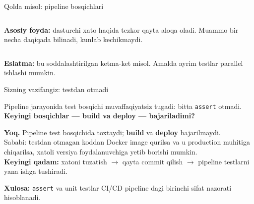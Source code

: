 \documentclass[aspectratio=169,11pt]{beamer}
\newcommand{\uzq}{\textquotesingle{}}   %
\begin{document}
\begin{frame}{Qo\uzq{}lda misol: pipeline bosqichlari}
\begin{columns}[T,totalwidth=\textwidth]
    \begin{column}{0.41\textwidth}
      \begin{tcolorbox}[okbox,top=2pt,bottom=2pt,left=4pt,right=4pt]
        \footnotesize
        \textbf{Asosiy foyda:}
        dasturchi xato haqida tezkor qayta aloqa oladi.
        Muammo bir necha daqiqada bilinadi, kunlab kechikmaydi.
      \end{tcolorbox}
    \end{column}
  \end{columns}

  \vspace{2pt}
  {\scriptsize
  \textbf{Eslatma:} bu soddalashtirilgan ketma-ket misol.
  Amalda ayrim testlar parallel ishlashi mumkin.
  }
\end{frame}

\begin{frame}{Sizning vazifangiz: testdan o\uzq{}tmadi}
  \small

  \begin{tcolorbox}[warnbox,title=Savol,top=2pt,bottom=2pt]
    Pipeline jarayonida test bosqichi muvaffaqiyatsiz tugadi:
    bitta \texttt{assert} o\uzq{}tmadi.\\[3pt]
    \textbf{Keyingi bosqichlar --- build va deploy --- bajariladimi?}
  \end{tcolorbox}

  \pause

  \vspace{3pt}

  \begin{tcolorbox}[okbox,title=Javob,top=2pt,bottom=2pt]
    \small
    \textbf{Yo\uzq{}q.} Pipeline test bosqichida to\uzq{}xtaydi;
    \textbf{build} va \textbf{deploy} bajarilmaydi.\\[4pt]

    \footnotesize
    Sababi: testdan o\uzq{}tmagan koddan Docker image qurilsa va u production
    muhitiga chiqarilsa, xatoli versiya foydalanuvchiga yetib borishi mumkin.\\[3pt]

    \textbf{Keyingi qadam:} xatoni tuzatish $\rightarrow$ qayta commit qilish
    $\rightarrow$ pipeline testlarni yana ishga tushiradi.
  \end{tcolorbox}

  \vspace{3pt}

  {\scriptsize
  \textbf{Xulosa:} \texttt{assert} va unit testlar CI/CD pipeline dagi birinchi
  sifat nazorati hisoblanadi.
  }
\end{frame}
\end{document}
